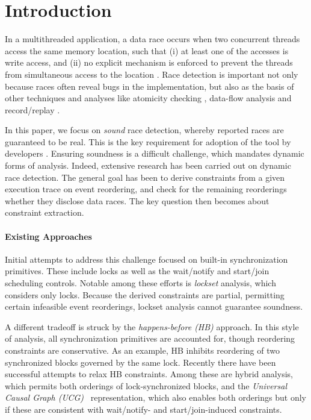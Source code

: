 \section{Introduction}\label{Se:introduction}

In a multithreaded application, a data race occurs when two concurrent threads access the same memory location, such that (i) at least one of the accesses is write access, and (ii) no explicit mechanism is enforced to prevent the threads from simultaneous access to the location \cite{eraser}. Race detection is important not only because races often reveal bugs in the implementation, but also as the basis of other techniques and analyses like atomicity checking \cite{learning,avio,ordervio}, data-flow analysis \cite{dataflow} and record/replay \cite{leap,replay2012}.

In this paper, we focus on \emph{sound} race detection, whereby reported races are guaranteed to be real. This is the key requirement for adoption of the tool by developers \cite{XXX}. Ensuring soundness is a difficult challenge, which mandates dynamic forms of analysis. Indeed, extensive research has been carried out on dynamic race detection. The general goal has been to derive constraints from a given execution trace on event reordering, and check for the remaining reorderings whether they disclose data races. The key question then becomes about constraint extraction.

\paragraph{Existing Approaches} Initial attempts to address this challenge focused on built-in synchronization primitives. These include locks as well as the wait/notify and start/join scheduling controls. Notable among these efforts is \emph{lockset} analysis, which considers only locks. Because the derived constraints are partial, permitting certain infeasible event reorderings, lockset analysis cannot guarantee soundness. 

A different tradeoff is struck by the \emph{happens-before (HB)} approach. In this style of analysis, all synchronization primitives are accounted for, though reordering constraints are conservative. As an example, HB inhibits reordering of two synchronized blocks governed by the same lock. Recently there have been successful attempts to relax HB constraints. Among these are hybrid analysis, which permits both orderings of lock-synchronized blocks, and the \emph{Universal Causal Graph (UCG)}~\cite{ucg} representation, which also enables both orderings but only if these are consistent with wait/notify- and start/join-induced constraints.

